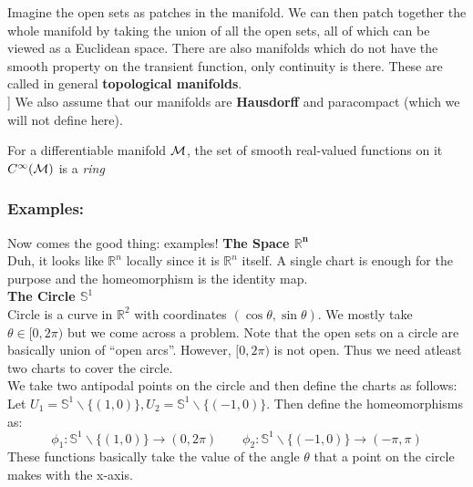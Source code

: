 Imagine the open sets as patches in the manifold. We can then patch together the whole manifold by taking the union of all the open sets, all of which can be viewed as a Euclidean space. There are also manifolds which do not have the smooth property on the transient function, only continuity is there. These are called in general \textbf{topological manifolds}.\\[0.2cm]
] We also assume that our manifolds are \textbf{Hausdorff} and paracompact (which we will not define here). 
\begin{ffact}
For a differentiable manifold $\mathcal M$, the set of smooth real-valued functions on it $C^\infty(\mathcal M)$ is a \textit{ring}
\end{ffact}
\subsubsection{Examples:}
Now comes the good thing: examples! 
\textbf{The Space $\mathbf{\mathbb{R}^n}$}\\[0.3cm]
Duh, it looks like $\mathbb{R}^n$ locally since it is $\mathbb{R}^n$ itself. A single chart is enough for the purpose and the homeomorphism is the identity map. \\[0.3cm]
\textbf{The Circle $\mathbb{S}^1$}\\[0.3cm]
Circle is a curve in $\mathbb{R}^2$ with coordinates $(\cos\theta, \sin\theta)$. We mostly take $\theta \in [0,2\pi)$ but we come across a problem. Note that the open sets on a circle are basically union of ``open arcs''. However, $[0,2\pi)$ is not open. Thus we need atleast two charts to cover the circle.\\[0.3cm]
We take two antipodal points on the circle and then define the charts as follows: \\[0.3cm]
Let $U_1 = \mathbb{S}^1\backslash \{(1,0)\},U_2 = \mathbb{S}^1\backslash \{(-1,0)\}$. Then define the homeomorphisms as:
$$\phi_1: \mathbb{S}^1\backslash \{(1,0)\}\rightarrow (0,2\pi) \quad \quad \phi_2: \mathbb{S}^1\backslash \{(-1,0)\}\rightarrow (-\pi,\pi)$$
These functions basically take the value of the angle $\theta$ that a point on the circle makes with the x-axis.  
